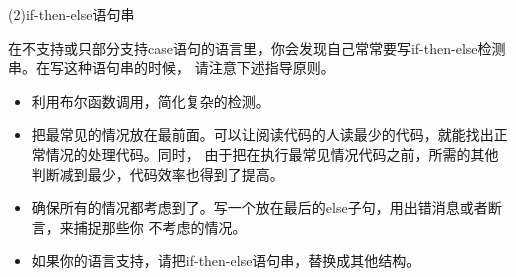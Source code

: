 \documentclass{article}
\begin{document}
\par
(2)if-then-else语句串
\par
在不支持或只部分支持case语句的语言里，你会发现自己常常要写if-then-else检测串。在写这种语句串的时候，
请注意下述指导原则。
\begin{itemize}
    \item 利用布尔函数调用，简化复杂的检测。
    \item 把最常见的情况放在最前面。可以让阅读代码的人读最少的代码，就能找出正常情况的处理代码。同时，
    由于把在执行最常见情况代码之前，所需的其他判断减到最少，代码效率也得到了提高。
    \item 确保所有的情况都考虑到了。写一个放在最后的else子句，用出错消息或者断言，来捕捉那些你
    不考虑的情况。
    \item 如果你的语言支持，请把if-then-else语句串，替换成其他结构。
\end{itemize}
\end{document}
